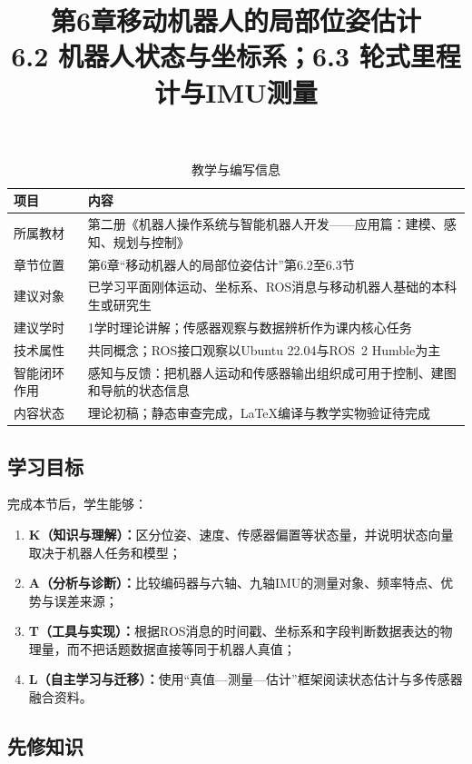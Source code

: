 \documentclass[UTF8,zihao=-4]{ctexart}
\title{第6章移动机器人的局部位姿估计\\
\large 6.2 机器人状态与坐标系；6.3 轮式里程计与IMU测量}
\author{}
\date{}
\begin{document}
\maketitle

\begin{table}[htbp]
  \centering
  \caption*{教学与编写信息}
  \begin{tabular}{p{}p{}}
    \toprule
    项目 & 内容 \\
    \midrule
    所属教材 & 第二册《机器人操作系统与智能机器人开发——应用篇：建模、感知、规划与控制》 \\
    章节位置 & 第6章“移动机器人的局部位姿估计”第6.2至6.3节 \\
    建议对象 & 已学习平面刚体运动、坐标系、ROS消息与移动机器人基础的本科生或研究生 \\
    建议学时 & 1学时理论讲解；传感器观察与数据辨析作为课内核心任务 \\
    技术属性 & 共同概念；ROS接口观察以Ubuntu 22.04与ROS~2 Humble为主 \\
    智能闭环作用 & 感知与反馈：把机器人运动和传感器输出组织成可用于控制、建图和导航的状态信息 \\
    内容状态 & 理论初稿；静态审查完成，LaTeX编译与教学实物验证待完成 \\
    \bottomrule
  \end{tabular}
\end{table}

\subsection*{学习目标}

完成本节后，学生能够：
\begin{enumerate}
  \item \textbf{K（知识与理解）：}区分位姿、速度、传感器偏置等状态量，并说明状态向量取决于机器人任务和模型；
  \item \textbf{A（分析与诊断）：}比较编码器与六轴、九轴IMU的测量对象、频率特点、优势与误差来源；
  \item \textbf{T（工具与实现）：}根据ROS消息的时间戳、坐标系和字段判断数据表达的物理量，而不把话题数据直接等同于机器人真值；
  \item \textbf{L（自主学习与迁移）：}使用“真值---测量---估计”框架阅读状态估计与多传感器融合资料。
\end{enumerate}

\subsection*{先修知识}
\end{document}
